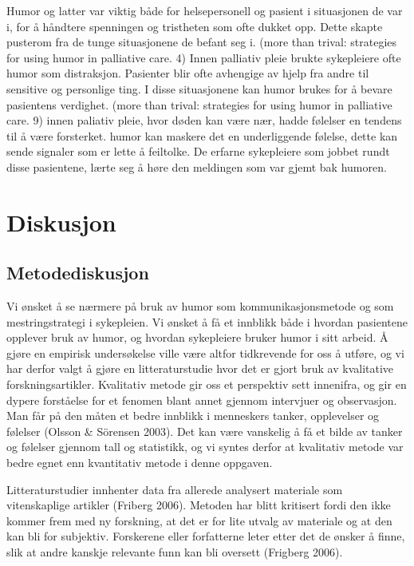 Humor og latter var viktig både for helsepersonell og pasient i situasjonen de
var i, for å håndtere spenningen og tristheten som ofte dukket opp. Dette
skapte pusterom fra de tunge situasjonene de befant seg i. (more than trival:
strategies for using humor in palliative care. 4) Innen palliativ pleie brukte
sykepleiere ofte humor som distraksjon. Pasienter blir ofte avhengige av hjelp
fra andre til sensitive og personlige ting. I disse situasjonene kan humor
brukes for å bevare pasientens verdighet. (more than trival: strategies for
using humor in palliative care. 9) innen paliativ pleie, hvor døden kan være
nær, hadde følelser en tendens til å være forsterket. humor kan maskere det en
underliggende følelse, dette kan sende signaler som er lette å feiltolke. De
erfarne sykepleiere som jobbet rundt disse pasientene, lærte seg å høre den
meldingen som var gjemt bak humoren. 

\chapter{Diskusjon}

\section{Metodediskusjon}

Vi ønsket å se nærmere på bruk av humor som kommunikasjonsmetode og som
mestringstrategi i sykepleien. Vi ønsket å få et innblikk både i hvordan
pasientene opplever bruk av humor, og hvordan sykepleiere bruker humor i sitt
arbeid.  Å gjøre en empirisk undersøkelse ville være altfor tidkrevende for oss
å utføre, og vi har derfor valgt å gjøre en litteraturstudie hvor det er gjort
bruk av kvalitative forskningsartikler.  Kvalitativ metode gir oss et
perspektiv sett innenifra, og gir en dypere forståelse for et fenomen blant
annet gjennom intervjuer og observasjon.  Man får på den måten et bedre
innblikk i menneskers tanker, opplevelser og følelser (Olsson \&{} Sörensen 2003).
Det kan være vanskelig å få et bilde av tanker og følelser gjennom tall og
statistikk, og vi syntes derfor at kvalitativ metode var bedre egnet enn
kvantitativ metode i denne oppgaven. 

Litteraturstudier innhenter data fra allerede analysert materiale som
vitenskaplige artikler (Friberg 2006). Metoden har blitt kritisert fordi den
ikke kommer frem med ny forskning, at det er for lite utvalg av materiale og at
den kan bli for subjektiv. Forskerene eller forfatterne leter etter det de
ønsker å finne, slik at andre kanskje relevante funn kan bli oversett (Frigberg
2006).

